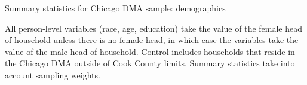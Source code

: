 \documentclass[12pt]{article}
\begin{document}
\clearpage
\printbibliography


\singlespacing
\clearpage
\begin{table}
\caption{Summary statistics for Chicago DMA sample: demographics}
\label{summary_table}

\footnotesize{All person-level variables (race, age, education) take the value of the female head of household unless there is no female head, in which case the variables take the value of the male head of household. Control includes households that reside in the Chicago DMA outside of Cook County limits. Summary statistics take into account sampling weights.}
\end{table}


\clearpage


\clearpage


\clearpage


\clearpage


\clearpage


\clearpage


\clearpage


\clearpage


\clearpage



\end{document}
